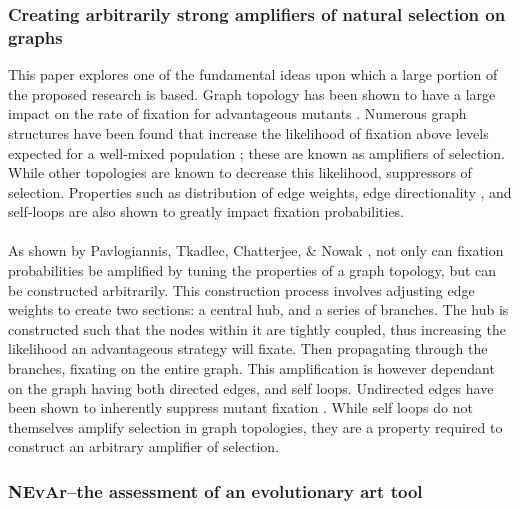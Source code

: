 \documentclass[10pt,a4paper]{article}
\begin{document}
	
	\subsubsection{Creating arbitrarily strong amplifiers of natural selection on graphs \citep{graph-amplifiers}}
	
	This paper explores one of the fundamental ideas upon which a large portion of the proposed research is based.
	Graph topology has been shown to have a large impact on the rate of fixation for advantageous mutants \citep{graph-amplifiers, birth-death-amplifiers, cooperation-on-graphs}.
	Numerous graph structures have been found that increase the likelihood of fixation above levels expected for a well-mixed population \citep{lieberman2005evolutionary, birth-death-amplifiers}; these are known as amplifiers of selection.
	While other topologies are known to decrease this likelihood, suppressors of selection.
	Properties such as distribution of edge weights, edge directionality \citep{birth-death-amplifiers}, and self-loops are also shown to greatly impact fixation probabilities.
	\\\\
	As shown by Pavlogiannis, Tkadlec, Chatterjee, \& Nowak \citep{graph-amplifiers}, not only can fixation probabilities be amplified by tuning the properties of a graph topology, but can be constructed arbitrarily.
	This construction process involves adjusting edge weights to create two sections: a central hub, and a series of branches.
	The hub is constructed such that the nodes within it are tightly coupled, thus increasing the likelihood an advantageous strategy will fixate.
	Then propagating through the branches, fixating on the entire graph.
	This amplification is however dependant on the graph having both directed edges, and self loops.
	Undirected edges have been shown to inherently suppress mutant fixation \citep{birth-death-amplifiers}.
	While self loops do not themselves amplify selection in graph topologies, they are a property required to construct an arbitrary amplifier of selection.
	
	
	\subsubsection{NEvAr–the assessment of an evolutionary art tool \citep{nevar}}
	
\end{document}
